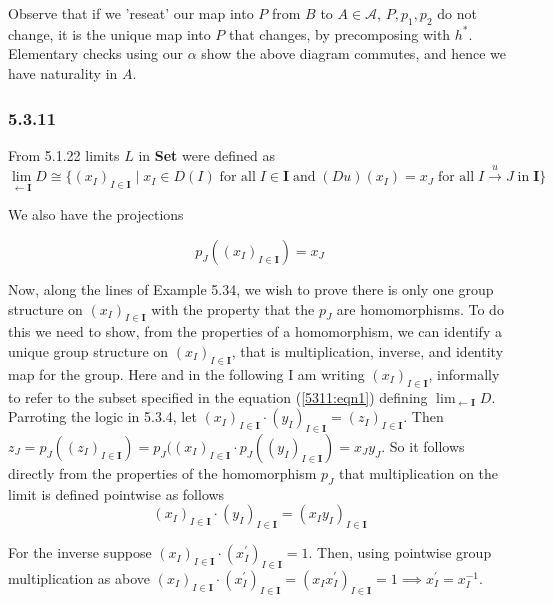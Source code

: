 \documentclass{article}
\begin{document}
Observe that if we 'reseat' our map into $P$ from $B$ to $A \in \mathcal{A}$, $P, p_1, p_2$ do not change, it is the unique map into $P$ that changes, by precomposing with $h^*$. Elementary checks using our $\alpha$ show the above diagram commutes, and hence we have naturality in $A$.

\subsubsection*{5.3.11}
From 5.1.22 limits $L$ in \textbf{Set} were defined as
\begin{equation}
  \label{5311:eqn1}
  \lim_{\leftarrow \mathbf{I}} D \cong \{(x_I)_{I \in \mathbf{I}} \mid x_I \in D(I) \; \text{for all} \; I \in \mathbf{I} \; \text{and} \; (Du)(x_I)=x_J \; \text{for all} \; I \xrightarrow{u} J \; \text{in} \; \mathbf{I}\}
\end{equation}

We also have the projections

\begin{equation}
  \label{5311:eqn2}
  p_J((x_I)_{I \in \mathbf{I}}) = x_J
\end{equation}

Now, along the lines of Example 5.34, we wish to prove there is only one group structure on $(x_I)_{I \in \mathbf{I}}$ with the property that the $p_J$ are homomorphisms. To do this we need to show, from the properties of a homomorphism, we can identify a unique group structure on $(x_I)_{I\in\mathbf{I}}$, that is multiplication, inverse, and identity map for the group. Here and in the following I am writing $(x_I)_{I\in\mathbf{I}}$, informally to refer to the subset specified in the equation (\ref{5311:eqn1}) defining $\lim_{\leftarrow \mathbf{I}} D$.  Parroting the logic in 5.3.4, let $(x_I)_{I\in\mathbf{I}} \cdot (y_I)_{I\in\mathbf{I}} = (z_I)_{I\in\mathbf{I}}$. Then $z_J = p_J((z_I)_{I\in\mathbf{I}}) = p_J((x_I)_{I\in\mathbf{I}} \cdot p_J((y_I)_{I\in\mathbf{I}}) = x_Jy_J$. So it follows directly from the properties of the homomorphism $p_J$ that multiplication on the limit is defined pointwise as follows
\begin{equation*}
  (x_I)_{I\in\mathbf{I}} \cdot (y_I)_{I\in\mathbf{I}} = (x_Iy_I)_{I\in\mathbf{I}}
\end{equation*}

For the inverse suppose $(x_I)_{I\in\mathbf{I}} \cdot (x^\prime_I)_{I\in\mathbf{I}} = 1$. Then, using pointwise group multiplication as above $(x_I)_{I\in\mathbf{I}} \cdot (x^\prime_I)_{I\in\mathbf{I}} = (x_Ix^\prime_I)_{I\in\mathbf{I}} = 1 \implies x_I^\prime = x_I^{-1}$.
\end{document}
